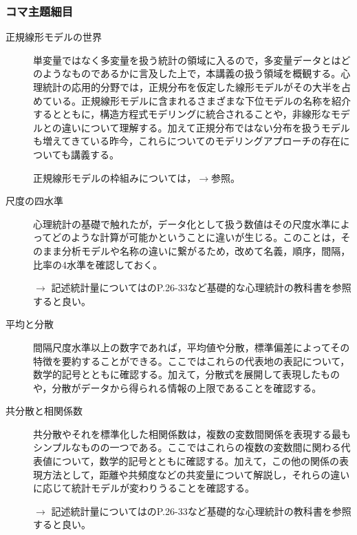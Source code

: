 \subsubsection{コマ主題細目}
\begin{description}
\item[正規線形モデルの世界]単変量ではなく多変量を扱う統計の領域に入るので，多変量データとはどのようなものであるかに言及した上で，本講義の扱う領域を概観する。心理統計の応用的分野では，正規分布を仮定した線形モデルがその大半を占めている。正規線形モデルに含まれるさまざまな下位モデルの名称を紹介するとともに，構造方程式モデリングに統合されることや，非線形なモデルとの違いについて理解する。加えて正規分布ではない分布を扱うモデルも増えてきている昨今，これらについてのモデリングアプローチの存在についても講義する。
\begin{flushright}
    正規線形モデルの枠組みについては，$\to$\citet{三中2018}参照。
\end{flushright}

\item[尺度の四水準]心理統計の基礎で触れたが，データ化として扱う数値はその尺度水準によってどのような計算が可能かということに違いが生じる。このことは，そのまま分析モデルや名称の違いに繋がるため，改めて名義，順序，間隔，比率の4水準を確認しておく。
\begin{flushright}
    $\to$ 記述統計量については\citet{川端201408}のP.26-33など基礎的な心理統計の教科書を参照すると良い。
\end{flushright}

\item[平均と分散]間隔尺度水準以上の数字であれば，平均値や分散，標準偏差によってその特徴を要約することができる。ここではこれらの代表地の表記について，数学的記号とともに確認する。加えて，分散式を展開して表現したものや，分散がデータから得られる情報の上限であることを確認する。

\item[共分散と相関係数]共分散やそれを標準化した相関係数は，複数の変数間関係を表現する最もシンプルなものの一つである。ここではこれらの複数の変数間に関わる代表値について，数学的記号とともに確認する。加えて，この他の関係の表現方法として，距離や共頻度などの共変量について解説し，それらの違いに応じて統計モデルが変わりうることを確認する。
\begin{flushright}
    $\to$ 記述統計量については\citet{川端201408}のP.26-33など基礎的な心理統計の教科書を参照すると良い。
\end{flushright}


\end{description}
